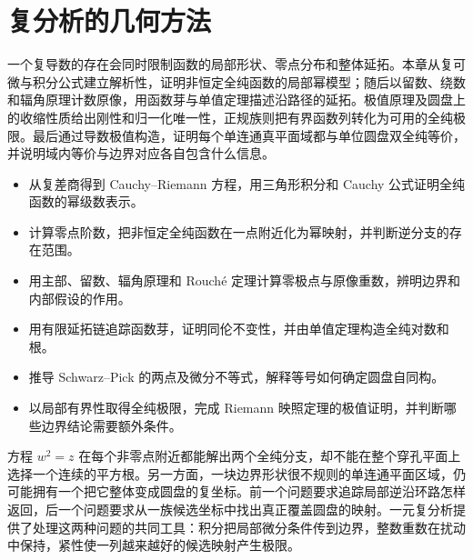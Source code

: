 
% 
% 

\chapter{复分析的几何方法}
\label{g4:ch:01}

\begin{chapterabstract}
	一个复导数的存在会同时限制函数的局部形状、零点分布和整体延拓。本章从复可微与积分公式建立解析性，证明非恒定全纯函数的局部幂模型；随后以留数、绕数和辐角原理计数原像，用函数芽与单值定理描述沿路径的延拓。极值原理及圆盘上的收缩性质给出刚性和归一化唯一性，正规族则把有界函数列转化为可用的全纯极限。最后通过导数极值构造，证明每个单连通真平面域都与单位圆盘双全纯等价，并说明域内等价与边界对应各自包含什么信息。
\end{chapterabstract}

\begin{learninggoals}
	\begin{itemize}
		\item 从复差商得到 Cauchy--Riemann 方程，用三角形积分和 Cauchy 公式证明全纯函数的幂级数表示。
		\item 计算零点阶数，把非恒定全纯函数在一点附近化为幂映射，并判断逆分支的存在范围。
		\item 用主部、留数、辐角原理和 Rouché 定理计算零极点与原像重数，辨明边界和内部假设的作用。
		\item 用有限延拓链追踪函数芽，证明同伦不变性，并由单值定理构造全纯对数和根。
		\item 推导 Schwarz--Pick 的两点及微分不等式，解释等号如何确定圆盘自同构。
		\item 以局部有界性取得全纯极限，完成 Riemann 映照定理的极值证明，并判断哪些边界结论需要额外条件。
	\end{itemize}
\end{learninggoals}

方程 \(w^2=z\) 在每个非零点附近都能解出两个全纯分支，却不能在整个穿孔平面上选择一个连续的平方根。另一方面，一块边界形状很不规则的单连通平面区域，仍可能拥有一个把它整体变成圆盘的复坐标。前一个问题要求追踪局部逆沿环路怎样返回，后一个问题要求从一族候选坐标中找出真正覆盖圆盘的映射。一元复分析提供了处理这两种问题的共同工具：积分把局部微分条件传到边界，整数重数在扰动中保持，紧性使一列越来越好的候选映射产生极限。

